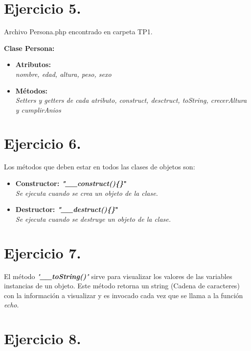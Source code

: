 \documentclass{article}
\begin{document}
\section*{Ejercicio 5.}

\indent Archivo Persona.php encontrado en carpeta TP1. \par

\indent \textbf{Clase Persona:}
\begin{itemize}
    \item \textbf{Atributos:}\\ 
    \textit{nombre, edad, altura, peso, sexo}
    \item \textbf{Métodos:}\\
    \textit{Setters y getters de cada atributo, construct, desctruct, toString, crecerAltura y cumplirAnios}
\end{itemize}

\section*{Ejercicio 6.}
Los métodos que deben estar en todos las clases de objetos son:
\begin{itemize}
    \item \indent \textbf{Constructor: \textit{"\_\_construct()\{\}}"}\\\indent \indent \textit{Se ejecuta cuando se crea un objeto de la clase.}
    \item \indent \textbf{Destructor: \textit{"\_\_destruct()\{\}}"}\\\indent \indent \textit{Se ejecuta cuando se destruye un objeto de la clase.}
\end{itemize}

\section*{Ejercicio 7.}

\indent El método \textit{"\textbf{\_\_toString()}"} sirve para visualizar los valores 
de las variables instancias de un objeto. Este método retorna un string 
(Cadena de caracteres) con la información a visualizar y es invocado cada 
vez que se llama a la función \textit{echo}.

\section*{Ejercicio 8.}
\end{document}
